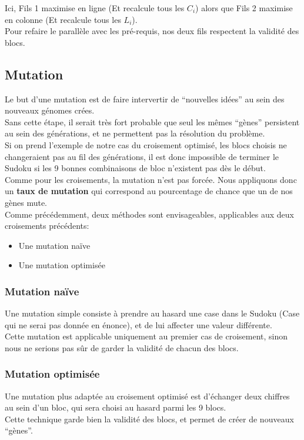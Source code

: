                     Ici, Fils 1 maximise en ligne (Et recalcule tous les $C_i$) alors que Fils 2 maximise en colonne (Et recalcule tous les $L_i$).\\

                    Pour refaire le parallèle avec les pré-requis, nos deux fils respectent la validité des blocs.
        \subsection{Mutation}
            Le but d'une mutation est de faire intervertir de ``nouvelles idées'' au sein des nouveaux génomes crées.\\
            Sans cette étape, il serait très fort probable que seul les mêmes ``gènes'' persistent au sein des générations, et ne permettent pas la résolution du problème.\\

            Si on prend l'exemple de notre cas du croisement optimisé, les blocs choisis ne changeraient pas au fil des générations, il est donc impossible de terminer le Sudoku si les 9 bonnes combinaisons de bloc n'existent pas dès le début.\\

            Comme pour les croisements, la mutation n'est pas forcée. Nous appliquons donc un \textbf{taux de mutation} qui correspond au pourcentage de chance que un de nos gènes mute.\\

            Comme précédemment, deux méthodes sont envisageables, applicables aux deux croisements précédents:
            \begin{itemize}
                \item Une mutation naïve
                \item Une mutation optimisée
            \end{itemize}
            \subsubsection{Mutation naïve}
                Une mutation simple consiste à prendre au hasard une case dans le Sudoku (Case qui ne serai pas donnée en énonce), et de lui affecter une valeur différente.\\
                Cette mutation est applicable uniquement au premier cas de croisement, sinon nous ne serions pas sûr de garder la validité de chacun des blocs.
            \subsubsection{Mutation optimisée}
                Une mutation plus adaptée au croisement optimisé est d'échanger deux chiffres au sein d'un bloc, qui sera choisi au hasard parmi les 9 blocs.\\
                Cette technique garde bien la validité des blocs, et permet de créer de nouveaux ``gènes''.\\

